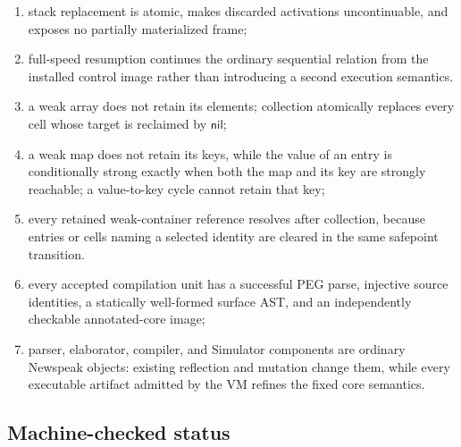 \documentclass[11pt]{article}
\numberwithin{equation}{section}
\newcommand{\kw}[1]{\ensuremath{\mathsf{#1}}}
\newcommand{\nil}{\kw{nil}}
\begin{document}
\begin{enumerate}
      token, and every successful mutation invalidates that token;
\item stack replacement is atomic, makes discarded activations
      uncontinuable, and exposes no partially materialized frame;
\item full-speed resumption continues the ordinary sequential relation from
      the installed control image rather than introducing a second execution
      semantics.
\item a weak array does not retain its elements; collection atomically replaces
      every cell whose target is reclaimed by $\nil$;
\item a weak map does not retain its keys, while the value of an entry is
      conditionally strong exactly when both the map and its key are strongly
      reachable; a value-to-key cycle cannot retain that key;
\item every retained weak-container reference resolves after collection,
      because entries or cells naming a selected identity are cleared in the
      same safepoint transition.
\item every accepted compilation unit has a successful PEG parse, injective
      source identities, a statically well-formed surface AST, and an
      independently checkable annotated-core image;
\item parser, elaborator, compiler, and Simulator components are ordinary
      Newspeak objects: existing reflection and mutation change them, while
      every executable artifact admitted by the VM refines the fixed core
      semantics.
\end{enumerate}

\subsection{Machine-checked status}
\end{document}
